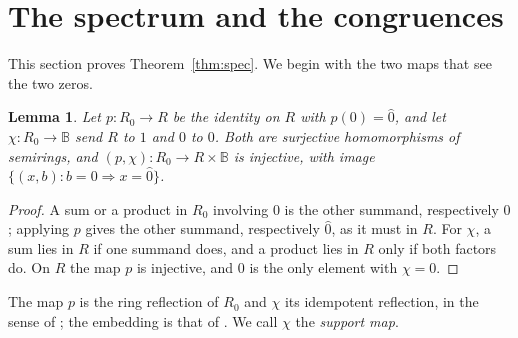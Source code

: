 \documentclass[11pt]{amsart}
\newtheorem{lemma}[thm]{Lemma}
\theoremstyle{remark}
\newcommand{\B}{\mathbb B}
\newcommand{\oz}{\widehat{0}}
\begin{document}
\section{The spectrum and the congruences}

This section proves Theorem~\ref{thm:spec}. We begin with the two maps that see the two zeros.

\begin{lemma}\label{lem:normal}
Let $p\colon R_0\to R$ be the identity on $R$ with $p(0)=\oz$, and let $\chi\colon R_0\to\B$ send $R$ to $1$ and $0$ to $0$. Both are surjective homomorphisms of semirings, and $(p,\chi)\colon R_0\to R\times\B$ is injective, with image $\{(x,b):b=0\Rightarrow x=\oz\}$.
\end{lemma}

\begin{proof}
A sum or a product in $R_0$ involving $0$ is the other summand, respectively $0$; applying $p$ gives the other summand, respectively $\oz$, as it must in $R$. For $\chi$, a sum lies in $R$ if one summand does, and a product lies in $R$ only if both factors do. On $R$ the map $p$ is injective, and $0$ is the only element with $\chi=0$.
\end{proof}

The map $p$ is the ring reflection of $R_0$ and $\chi$ its idempotent reflection, in the sense of \cite[Proposition 4.13]{FGJM}; the embedding is that of \cite[Theorem 7.2]{FGJM}. We call $\chi$ the \emph{support map}.
\end{document}
